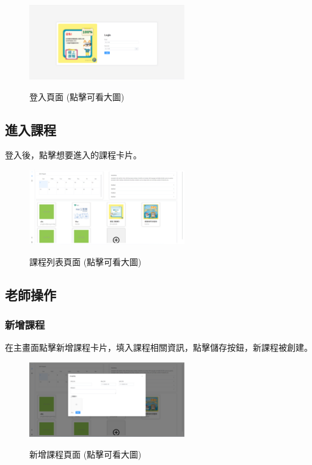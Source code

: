 \documentclass[12pt]{article}
\begin{document}
\begin{figure}[H]
  \centering
  \href{https://raw.githubusercontent.com/programingtw/proglearn-plan/main/2023全國大專校院智慧創新暨跨域整合創作競賽/img/login.png}{
    \includegraphics[width=0.60\textwidth]{./img/login.png}
  }
  \caption{登入頁面 (點擊可看大圖)}
\end{figure}

\subsection{進入課程}
登入後，點擊想要進入的課程卡片。

\begin{figure}[H]
  \centering
  \href{https://raw.githubusercontent.com/programingtw/proglearn-plan/main/2023全國大專校院智慧創新暨跨域整合創作競賽/img/course.png}{
    \includegraphics[width=0.60\textwidth]{./img/course.png}
  }
  \caption{課程列表頁面 (點擊可看大圖)}
\end{figure}

\subsection{老師操作}

\subsubsection{新增課程}
在主畫面點擊新增課程卡片，填入課程相關資訊，點擊儲存按鈕，新課程被創建。

\begin{figure}[H]
  \centering
  \href{https://raw.githubusercontent.com/programingtw/proglearn-plan/main/2023全國大專校院智慧創新暨跨域整合創作競賽/img/addCourse.png}{
    \includegraphics[width=0.60\textwidth]{./img/addCourse.png}
  }
  \caption{新增課程頁面 (點擊可看大圖)}
\end{figure}
\end{document}
